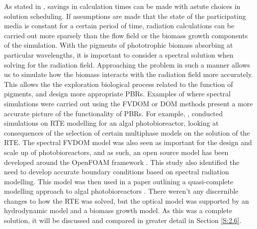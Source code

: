 As stated in \cite{krishnamoorthy2014}, savings in calculation times can be made with astute choices in solution scheduling. If assumptions are made that the state of the participating media is constant for a certain period of time, radiation calculations can be carried out more sparsely than the flow field or the biomass growth components of the simulation. With the pigments of phototrophic biomass absorbing at particular wavelengths, it is important to consider a spectral solution when solving for the radiation field. Approaching the problem in such a manner allows us to simulate how the biomass interacts with the radiation field more accurately. This allows the the exploration biological process related to the function of pigments, and design more appropriate PBRs. Examples of where spectral simulations were carried out using the FVDOM or DOM methods present a more accurate picture of the functionality of PBRs. For example, \cite{krishnamoorthy2014},  conducted simulations on RTE modelling for an algal photobioreactor, looking at consequences of the selection of certain multiphase models on the solution of the RTE. The spectral FVDOM model was also seen as important for the design and scale up of photobioreactors, and as such, an open source model has been developed around the OpenFOAM framework \cite{kong2014}. This study also identified the need to develop accurate boundary conditions based on spectral radiation modelling. This model was then used in a paper outlining a quasi-complete modelling approach to algal photobioreactors \cite{gao2016}. There weren't any discernible changes to how the RTE was solved, but the optical model was supported by an hydrodynamic model and a biomass growth model. As this was a complete solution, it will be discussed and compared in greater detail in Section \ref{S:2.6}. 
\skippingparagraph

